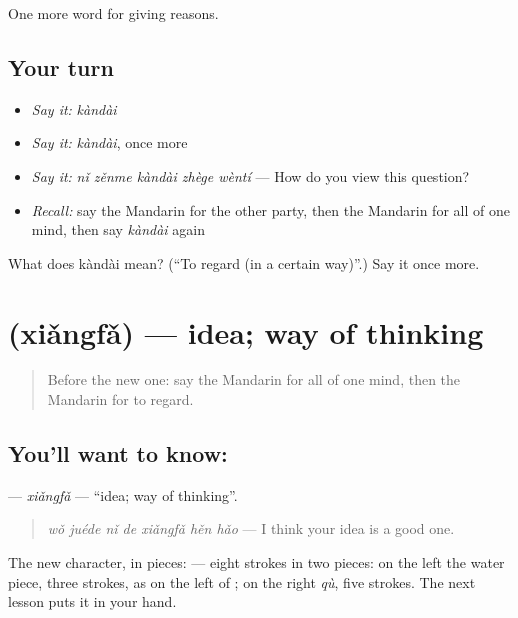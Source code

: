 \begin{grammarlens}[title={What you've built}]
One more word for giving reasons.
\end{grammarlens}

\subsection*{Your turn}
\begin{itemize}
\raggedright
  \item \emph{Say it:} \emph{kàndài}
  \item \emph{Say it:} \emph{kàndài}, once more
  \item \emph{Say it:} \emph{nǐ zěnme kàndài zhège wèntí} — How do you view this question?
  \item \emph{Recall:} say the Mandarin for the other party, then the Mandarin for all of one mind, then say \emph{kàndài} again
\end{itemize}

\begin{tcolorbox}[breakable,colback=teal!4,colframe=teal!35!black,title={Before you move on}]
What does kàndài mean? (\textquotedblleft{}To regard (in a certain way)\textquotedblright{}.) Say it once more.
\end{tcolorbox}
\section[\texorpdfstring{\zh{想法} (xiǎngfǎ)}{想法 (xiǎngfǎ)}]{ (xiǎngfǎ) — idea; way of thinking}

\label{lesson:ZH-C349-xiangfa}



\begin{quote}
Before the new one: say the Mandarin for all of one mind, then the Mandarin for to regard.
\end{quote}

\subsection*{You'll want to know: }
\textbf{} — \emph{xiǎngfǎ} — \textquotedblleft{}idea; way of thinking\textquotedblright{}.

\begin{quote}
\textbf{} \emph{wǒ juéde nǐ de xiǎngfǎ hěn hǎo} — I think your idea is a good one.
\end{quote}

The new character, in pieces:  — eight strokes in two pieces: on the left the water piece, three strokes, as on the left of ; on the right  \emph{qù}, five strokes. The next lesson puts it in your hand.

